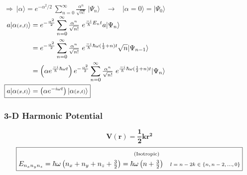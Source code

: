 \documentclass[12pt]{article}
\newcommand{\mss}[1]{\text{\scriptsize\(#1\)}} %
\begin{document}
\begin{minipage}{.51\textwidth}
    \( \displaystyle \Rightarrow \ \boxed{ \big| \alpha \big\rangle 
    = e^{- \alpha^{2} / 2} \ \sum_{n=0}^\infty 
    \tfrac{\alpha^n}{\sqrt{n!}} \ | \Psi_n \rangle } \) 
    \ \(\rightarrow\) \
    \( \big| \alpha {\scriptstyle =} 0 \big\rangle = | \Psi_0 \rangle \)\\[10pt]
    \( \begin{aligned}
        a | \alpha{\scriptstyle(x,t)} \rangle 
            &= e^{- \frac{\alpha^{2}}{2}} \sum_{n=0}^\infty 
            \tfrac{\alpha^n}{\sqrt{n!}} \ e^{\frac{-i}{\hbar} E_n t} a | \Psi_n \rangle\\
        &= e^{- \frac{\alpha^{2}}{2}} \sum_{n=0}^\infty 
            \tfrac{\alpha^n}{\sqrt{n!}} \ e^{\frac{-i}{\hbar} 
            \hbar \omega (\frac{1}{2} + n) t} \sqrt{n} | \Psi_{n-1} \rangle \\
        &= \left( \alpha e^{\frac{-i}{\hbar} \hbar \omega t} \right) e^{- \frac{\alpha^{2}}{2}}
            \sum_{n=0}^\infty \tfrac{\alpha^n}{\sqrt{n!}} \ e^{\frac{-i}{\hbar} 
            \hbar \omega (\frac{1}{2} + n) t} | \Psi_n \rangle\\
        \Aboxed{ a | \alpha{\scriptstyle(x,t)} \rangle 
            &= \left( \alpha e^{-i \omega t} \right) | \alpha{\scriptstyle(x,t)} \rangle }
    \end{aligned} \)
\end{minipage}

\vspace{1cm}

\vspace{10pt}\noindent
\subsubsection{3-D Harmonic Potential}

\[ \boldsymbol{V(r) = \frac{1}{2} k r^2} \]
\[ \boxed{ 
    E_{n_x n_y n_z} = \hbar \omega \left(n_x + n_y + n_z + \tfrac{3}{2}\right) 
    = \begin{gathered}[b]
        \text{\scriptsize(Isotropic)}\\[-1pt]
        \hbar\omega \left( n + \tfrac{3}{2} \right) 
    \end{gathered}
    \hspace{10pt} \mss{l = n - 2k \in \{ n, n-2, ..., 0 \}}
} \]
\end{document}
